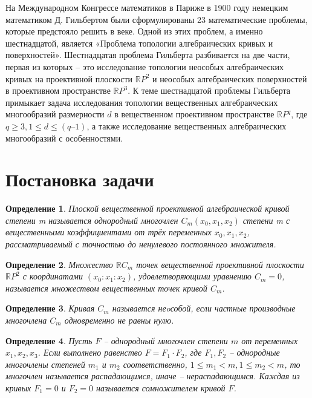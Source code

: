 \documentclass[11pt]{article}
\newtheorem{definition}{Определение}
\newcommand{\RomanNumeralCaps}[1]
    {\MakeUppercase{\romannumeral #1}}
\begin{document}
        На \RomanNumeralCaps{2} Международном Конгрессе математиков в Париже в 1900 году немецким математиком Д. Гильбертом были сформулированы 23 математические проблемы, которые предстояло решить в \RomanNumeralCaps{20} веке. Одной из этих проблем, а именно шестнадцатой, является «Проблема топологии алгебраических кривых и поверхностей». Шестнадцатая проблема Гильберта разбивается на две части, первая из которых – это исследование топологии неособых алгебраических кривых на проективной плоскости $\mathbb RP^2$ и неособых алгебраических поверхностей в проективном пространстве $\mathbb RP^3$. К теме шестнадцатой проблемы Гильберта примыкает задача исследования топологии вещественных алгебраических многообразий размерности $d$ в вещественном проективном пространстве $\mathbb RP^q$, где $q \geqslant 3, 1 \leqslant d \leqslant (q–1)$, а также исследование вещественных алгебраических многообразий с особенностями.
\newpage
\section{Постановка задачи}

\begin{definition}
 Плоской вещественной проективной алгебраической кривой степени m называется однородный многочлен $C_m(x_0, x_1, x_2)$ степени m с вещественными коэффициентами от трёх переменных $x_0, x_1, x_2$, рассматриваемый с точностью до ненулевого постоянного множителя.
\end{definition}

\begin{definition}
Множество $\mathbb RC_m$ точек вещественной проективной плоскости $\mathbb RP^2$ с координатами $(x_0:x_1:x_2)$, удовлетворяющими уравнению $C_m = 0$, называется множеством вещественных точек кривой $C_m$.
\end{definition}

\begin{definition}
Кривая $C_m$ называется неoсобой, если частные производные многочлена $C_m$ одновременно не равны нулю.
\end{definition}

\begin{definition}
Пусть $F$ -- однородный многочлен степени $m$ от переменных $x_1, x_2, x_3$. Если выполнено равенство $F = F_1 \cdot F_2$, где $F_1, F_2$ -- однородные многочлены степеней $m_1$ и $m_2$ соответственно, $1 \leqslant m_1 < m, 1 \leqslant m_2 < m$, то многочлен называется распадающимся, иначе -- нераспадающимся. Каждая из кривых $F_1 = 0$ и $F_2 = 0$ называется сомножителем кривой $F$.
\end{definition}
\end{document}
